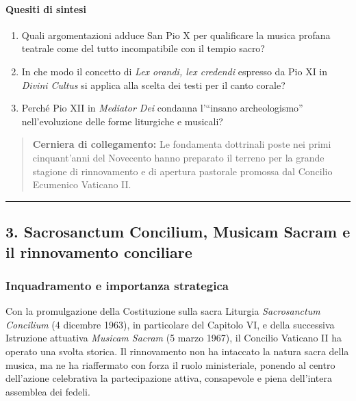 \documentclass[12pt,a4paper]{article}
\begin{document}
	\paragraph{Quesiti di sintesi}\label{quesiti-di-sintesi}
	
	\begin{enumerate}[label=\arabic*.,leftmargin=*]
		\item Quali argomentazioni adduce San Pio X per qualificare la musica profana teatrale come del tutto incompatibile con il tempio sacro?
		\item In che modo il concetto di \emph{Lex orandi, lex credendi} espresso da Pio XI in \emph{Divini Cultus} si applica alla scelta dei testi per il canto corale?
		\item Perché Pio XII in \emph{Mediator Dei} condanna l'``insano archeologismo'' nell'evoluzione delle forme liturgiche e musicali?
	\end{enumerate}
	
	\begin{quote}
		\textbf{Cerniera di collegamento:} Le fondamenta dottrinali poste nei primi cinquant'anni del Novecento hanno preparato il terreno per la grande stagione di rinnovamento e di apertura pastorale promossa dal Concilio Ecumenico Vaticano II.
	\end{quote}
	
	\begin{center}\rule{0.5\linewidth}{0.5pt}\end{center}
	
	\subsection{3. Sacrosanctum Concilium, Musicam Sacram e il rinnovamento conciliare}\label{sacrosanctum-concilium-musicam-sacram-e-il-rinnovamento-conciliare}
	
	\subsubsection{Inquadramento e importanza strategica}\label{inquadramento-e-importanza-strategica-2}
	
	Con la promulgazione della Costituzione sulla sacra Liturgia \emph{Sacrosanctum Concilium} (4 dicembre 1963), in particolare del Capitolo VI, e della successiva Istruzione attuativa \emph{Musicam Sacram} (5 marzo 1967), il Concilio Vaticano II ha operato una svolta storica. Il rinnovamento non ha intaccato la natura sacra della musica, ma ne ha riaffermato con forza il ruolo ministeriale, ponendo al centro dell'azione celebrativa la partecipazione attiva, consapevole e piena dell'intera assemblea dei fedeli.
	
\end{document}
